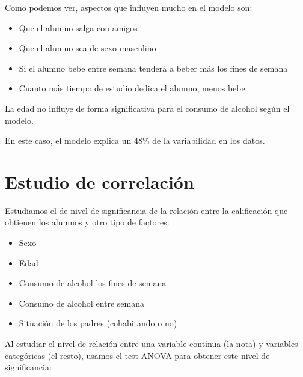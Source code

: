 \documentclass[12pt,a4paper]{article}
\begin{document}
Como podemos ver, aspectos que influyen mucho en el modelo son:
\begin{itemize}
\item Que el alumno salga con amigos
\item Que el alumno sea de sexo masculino
\item Si el alumno bebe entre semana tenderá a beber más los fines de semana
\item Cuanto más tiempo de estudio dedica el alumno, menos bebe
\end{itemize}


La edad no influye de forma significativa para el consumo de alcohol según el modelo.

En este caso, el modelo explica un 48\% de la variabilidad en los datos.


\section{Estudio de correlación}

Estudiamos el de nivel de significancia de la relación entre la calificación que obtienen los alumnos y otro tipo de factores:
\begin{itemize}
\item Sexo
\item Edad
\item Consumo de alcohol los fines de semana
\item Consumo de alcohol entre semana
\item Situación de los padres (cohabitando o no)
\end{itemize}

Al estudiar el nivel de relación entre una variable contínua (la nota) y variables categóricas (el resto), usamos el test ANOVA para obtener este nivel de significancia:
\end{document}
